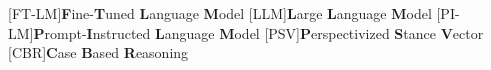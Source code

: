 \begin{acronym}
    [FT-LM]{\textbf{F}ine-\textbf{T}uned \textbf{L}anguage \textbf{M}odel}
    [LLM]{\textbf{L}arge \textbf{L}anguage \textbf{M}odel}
    [PI-LM]{\textbf{P}rompt-\textbf{I}nstructed \textbf{L}anguage \textbf{M}odel}
    [PSV]{\textbf{P}erspectivized \textbf{S}tance \textbf{V}ector}
    [CBR]{\textbf{C}ase \textbf{B}ased \textbf{R}easoning}
\end{acronym}